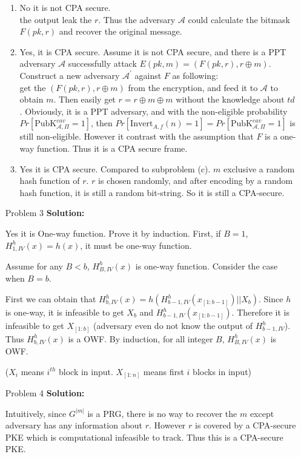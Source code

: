 \normalfont\documentclass[letterpaper,11pt]{article}
\begin{document}
\begin{enumerate}
\begin{enumerate}
	\item No it is not CPA secure.\\
	the output leak the $r$. Thus the adversary $\mathcal{A}$ could calculate the bitmask $F(pk,r)$ and recover the original message.
	\item Yes, it is CPA secure.
	Assume it is not CPA secure, and there is a PPT adversary $\mathcal{A}$ successfully attack $E(pk,m) = (F(pk,r),r \oplus m)$.
	Construct a new adversary $\mathcal{A}^\prime$ against $F$ as following:\\
	get the $(F(pk,r),r \oplus m)$ from the encryption, and feed it to $\mathcal{A}$ to obtain $m$. Then easily get $r = r \oplus m \oplus m$ without the knowledge about $td$. Obviously, it is a PPT adversary, and with the non-eligible probability $Pr[\text{PubK}^{eav}_{\mathcal{A},\Pi} = 1]$, then $Pr[\text{Invert}_{A,f}(n) = 1] = Pr[\text{PubK}^{eav}_{\mathcal{A},\Pi} = 1]$ is still non-eligible. However it contrast with the assumption that $F$ is a one-way function. Thus it is a CPA secure frame.
	\item Yes it is CPA secure.
	Compared to subproblem (c). $m$ exclusive a random hash function of $r$. $r$ is chosen randomly, and after encoding by a random hash function, it is still a random bit-string. So it is still a CPA-secure.
	\end{enumerate}
\item [Problem 3]\textbf{Solution:}\par
	Yes it is One-way function. Prove it by induction.
	First, if $B = 1$, $H^h_{1,IV}(x) = h(x)$, it must be one-way function.\par
	Assume for any $B < b$, $H^h_{B,IV}(x)$ is one-way function. Consider the case when $B = b$.\par
	First we can obtain that $H^h_{b,IV}(x)= h(H^h_{b-1,IV}(x_{[1:b-1]}) || X_b)$. Since $h$ is one-way, it is infeasible to get $X_b$ and $H^h_{b-1,IV}(x_{[1:b-1]})$. Therefore it is infeasible to get $X_{[1:b]}$ (adversary even do not know the output of $H^h_{b-1,IV}$). Thus $H^h_{b,IV}(x)$ is a OWF.
	By induction, for all integer $B$, $H^h_{B,IV}(x)$ is OWF.\par
	($X_i$ means $i^{th}$ block in input. $X_{[1:n]}$ means first $i$ blocks in input)
\item [Problem 4]\textbf{Solution:}\par
	Intuitively, since $G^{|m|}$ is a PRG, there is no way to recover the $m$ except adversary has any information about $r$. However $r$ is covered by a CPA-secure PKE which is computational infeasible to track. Thus this is a CPA-secure PKE.

\end{enumerate}
\end{document}
